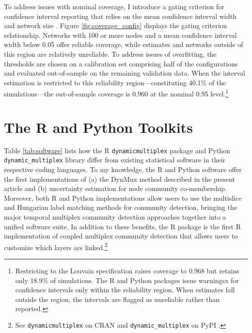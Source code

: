 \documentclass[11pt, letterpaper]{article}
\begin{document}
To address issues with nominal coverage, I introduce a gating criterion for confidence interval reporting that relies on the mean confidence interval width and network size \citep[see][for examples of gating]{chow1970optimum, king2006dangers}. Figure \ref{fig:coverage_config} displays the gating criterion relationship. Networks with 100 or more nodes and a mean confidence interval width below 0.05 offer reliable coverage, while estimates and networks outside of this region are relatively unreliable. To address issues of overfitting, the thresholds are chosen on a calibration set comprising half of the configurations and evaluated out-of-sample on the remaining validation data. When the interval estimation is restricted to this reliability region---constituting 40.1\% of the simulations---the out-of-sample coverage is 0.960 at the nominal 0.95 level.\footnote{Restricting to the Louvain specification raises coverage to 0.968 but retains only 18.9\% of simulations. The R and Python packages issue warningsx for confidence intervals only within the reliability region. When estimates fall outside the region, the intervals are flagged as unreliable rather than reported.}


\section{The R and Python Toolkits}
Table \ref{tab:software} lists how the R \texttt{dynamicmultiplex} package and Python \texttt{dynamic\_multiplex} library differ from existing statistical software in their respective coding languages. To my knowledge, the R and Python software offer the first implementations of (a) the DynMux method described in the present article and (b) uncertainty estimation for node community co-membership. Moreover, both R and Python implementations allow users to use the multislice and Hungarian label matching methods for community detection, bringing the major temporal multiplex community detection approaches together into a unified software suite. In addition to these benefits, the R package is the first R implementation of coupled multiplex community detection that allows users to customize which layers are linked.\footnote{See \texttt{dynamicmultiplex} on CRAN \citep{dynamicmultiplexR} and \texttt{dynamic\_multiplex} on PyPI \citep{dynamicmultiplexPy}.}
\end{document}
